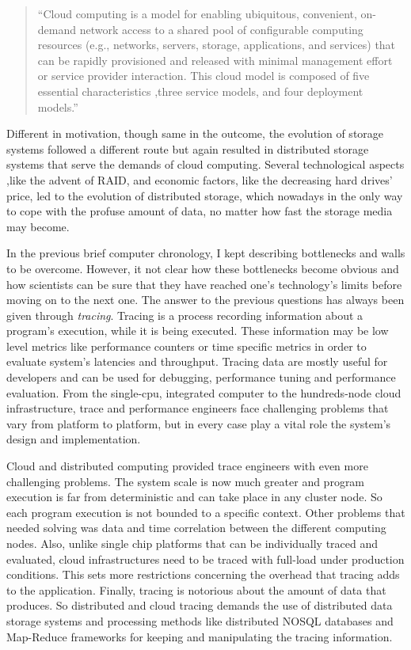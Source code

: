 \begin{quotation}
    ``Cloud computing is a model for enabling ubiquitous, convenient, on-demand
    network access to a shared pool of configurable computing resources (e.g.,
    networks, servers, storage, applications, and services) that can be rapidly
    provisioned and released with minimal management effort or service provider
    interaction.  This cloud model is composed of five essential characteristics
    ,three service models, and four deployment models.''\cite{clouddef}
\end{quotation}

Different in motivation, though same in the outcome, the evolution of storage
systems followed a different route but again resulted in distributed storage
systems that serve the demands of cloud computing. Several technological aspects
,like the advent of RAID, and economic factors, like the decreasing hard drives'
price, led to the evolution of distributed storage, which nowadays in the only
way to cope with the profuse amount of data, no matter how fast the storage
media may become.

In the previous brief computer chronology, I kept describing bottlenecks and
walls to be overcome. However, it not clear how these bottlenecks become
obvious and how scientists can be sure that they have reached one's
technology's limits before moving on to the next one. The answer to the
previous questions has always been given through \textit{tracing}. Tracing is a
process recording information about a program's execution, while it is being
executed. These information may be low level metrics like performance counters
or time specific metrics in order to evaluate system's latencies and
throughput. Tracing data are mostly useful for developers and can be used for
debugging, performance tuning and performance evaluation. From the single-cpu,
integrated computer to the hundreds-node cloud infrastructure, trace and
performance engineers face challenging problems that vary from platform to
platform, but in every case play a vital role the system's design and
implementation.

Cloud and distributed computing provided trace engineers with even more
challenging problems. The system scale is now much greater and program
execution is far from deterministic and can take place in any cluster node. So
each program execution is not bounded to a specific context. Other problems
that needed solving was data and time correlation between the different
computing nodes. Also, unlike single chip platforms that can be individually
traced and evaluated, cloud infrastructures need to be traced with full-load
under production conditions. This sets more restrictions concerning the overhead
that tracing adds to the application. Finally, tracing is notorious about the
amount of data that produces. So distributed and cloud tracing demands the use
of distributed data storage systems and processing methods like distributed
NOSQL databases and Map-Reduce frameworks for keeping and manipulating the
tracing information. 

